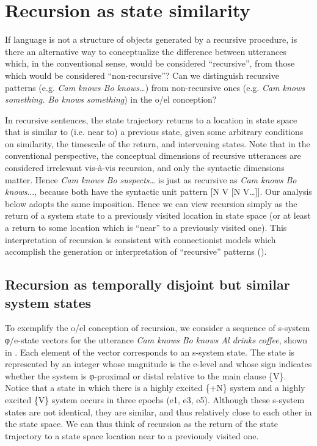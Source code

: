 \section{Recursion as state similarity}

If language is not a structure of objects generated by a recursive procedure, is there an alternative way to conceptualize the difference between utterances which, in the conventional sense, would be considered “recursive”, from those which would be considered “non-recursive”? Can we distinguish recursive patterns (e.g. \textit{Cam knows Bo knows…}) from non-recursive ones (e.g. \textit{Cam knows something. Bo knows something}) in the o/el conception? 

  In recursive sentences, the state trajectory returns to a location in state space that is similar to (i.e. near to) a previous state, given some arbitrary conditions on similarity, the timescale of the return, and intervening states. Note that in the conventional perspective, the conceptual dimensions of recursive utterances are considered irrelevant vis-à-vis recursion, and only the syntactic dimensions matter. Hence \textit{Cam knows Bo suspects…} is just as recursive as \textit{Cam knows Bo knows}..., because both have the syntactic unit pattern [N V [N V…]]. Our analysis below adopts the same imposition. Hence we can view recursion simply as the return of a system state to a previously visited location in state space (or at least a return to some location which is “near” to a previously visited one). This interpretation of recursion is consistent with connectionist models which accomplish the generation or interpretation of “recursive” patterns (\citealt{ChristiansenChater1999,Elman1989,Smolensky1990}).

\subsection{Recursion as temporally disjoint but similar system states}

To exemplify the o/el conception of recursion, we consider a sequence of s-system φ/e-state vectors for the utterance \textit{Cam knows Bo knows Al drinks coffee}, shown in {}. Each element of the vector corresponds to an s-system state. The state is represented by an integer whose magnitude is the e-level and whose sign indicates whether the system is φ-proximal or distal relative to the main clause \{V\}. Notice that a state in which there is a highly excited \{+N\} system and a highly excited \{V\} system occurs in three epochs (e1, e3, e5). Although these s-system states are not identical, they are similar, and thus relatively close to each other in the state space. We can thus think of recursion as the return of the state trajectory to a state space location near to a previously visited one.

